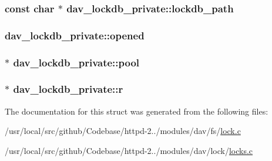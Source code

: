 \subsubsection[{\texorpdfstring{lockdb\+\_\+path}{lockdb_path}}]{\setlength{\rightskip}{0pt plus 5cm}const char $\ast$ dav\+\_\+lockdb\+\_\+private\+::lockdb\+\_\+path}\hypertarget{structdav__lockdb__private_a72431a8f24487656d4d3d9b51a359fff}{}\label{structdav__lockdb__private_a72431a8f24487656d4d3d9b51a359fff}
\subsubsection[{\texorpdfstring{opened}{opened}}]{ dav\+\_\+lockdb\+\_\+private\+::opened}\hypertarget{structdav__lockdb__private_a34cc60423ed00d90a9800cebed1ee74a}{}\label{structdav__lockdb__private_a34cc60423ed00d90a9800cebed1ee74a}
\subsubsection[{\texorpdfstring{pool}{pool}}]{ $\ast$ dav\+\_\+lockdb\+\_\+private\+::pool}\hypertarget{structdav__lockdb__private_a6bacca8de1371809b1943142568ba4ea}{}\label{structdav__lockdb__private_a6bacca8de1371809b1943142568ba4ea}
\subsubsection[{\texorpdfstring{r}{r}}]{ $\ast$ dav\+\_\+lockdb\+\_\+private\+::r}\hypertarget{structdav__lockdb__private_ad35f6c9b603531f4c64e10f17e5f8eca}{}\label{structdav__lockdb__private_ad35f6c9b603531f4c64e10f17e5f8eca}


The documentation for this struct was generated from the following files\+:\begin{DoxyCompactItemize}
\item 
/usr/local/src/github/\+Codebase/httpd-\/2../modules/dav/fs/\hyperlink{lock_8c}{lock.\+c}\item 
/usr/local/src/github/\+Codebase/httpd-\/2../modules/dav/lock/\hyperlink{locks_8c}{locks.\+c}\end{DoxyCompactItemize}
